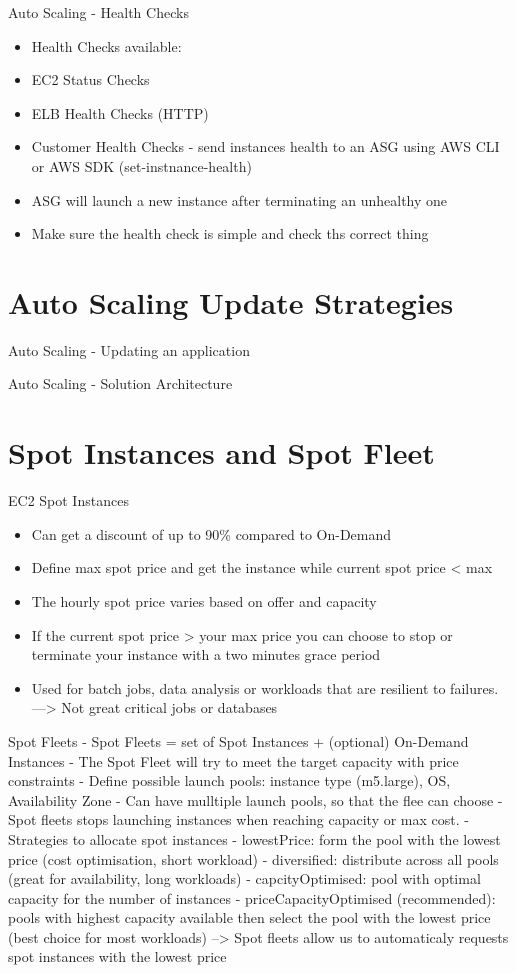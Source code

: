 Auto Scaling - Health Checks
\begin{itemize}
    \item Health Checks available:
    \item EC2 Status Checks
    \item ELB Health Checks (HTTP)
    \item Customer Health Checks - send instances health to an ASG using AWS CLI or AWS SDK (set-instnance-health)
    \item ASG will launch a new instance after terminating an unhealthy one
    \item Make sure the health check is simple and check ths correct thing
\end{itemize}


\section{Auto Scaling Update Strategies}
Auto Scaling - Updating an application

Auto Scaling - Solution Architecture



\section{Spot Instances and Spot Fleet}

EC2 Spot Instances
\begin{itemize}
    \item Can get a discount of up to 90\% compared to On-Demand
    \item Define max spot price and get the instance while current spot price < max
    \item The hourly spot price varies based on offer and capacity
    \item If the current spot price > your max price you can choose to stop or terminate your instance with a two minutes grace period
    \item Used for batch jobs, data analysis or workloads that are resilient to failures.
    ---> Not great critical jobs or databases
\end{itemize}


Spot Fleets
- Spot Fleets = set of Spot Instances + (optional) On-Demand Instances
- The Spot Fleet will try to meet the target capacity with price constraints
- Define possible launch pools: instance type (m5.large), OS, Availability Zone
- Can have mulltiple launch pools, so that the flee can choose
- Spot fleets stops launching instances when reaching capacity or max cost.
- Strategies to allocate spot instances
- lowestPrice: form the pool with the lowest price (cost optimisation, short workload)
- diversified: distribute across all pools (great for availability, long workloads)
- capcityOptimised: pool with optimal capacity for the number of instances
- priceCapacityOptimised (recommended): pools with highest capacity available then select the pool with the lowest price (best choice for most workloads)
--> Spot fleets allow us to automaticaly requests spot instances with the lowest price


